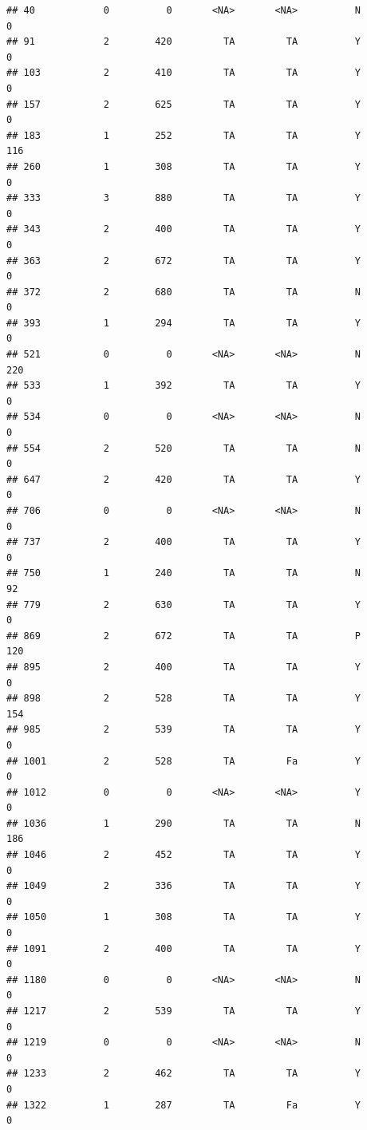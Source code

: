 \documentclass[]{article}
\begin{document}
\begin{verbatim}
## 40            0          0       <NA>       <NA>          N          0
## 91            2        420         TA         TA          Y          0
## 103           2        410         TA         TA          Y          0
## 157           2        625         TA         TA          Y          0
## 183           1        252         TA         TA          Y        116
## 260           1        308         TA         TA          Y          0
## 333           3        880         TA         TA          Y          0
## 343           2        400         TA         TA          Y          0
## 363           2        672         TA         TA          Y          0
## 372           2        680         TA         TA          N          0
## 393           1        294         TA         TA          Y          0
## 521           0          0       <NA>       <NA>          N        220
## 533           1        392         TA         TA          Y          0
## 534           0          0       <NA>       <NA>          N          0
## 554           2        520         TA         TA          N          0
## 647           2        420         TA         TA          Y          0
## 706           0          0       <NA>       <NA>          N          0
## 737           2        400         TA         TA          Y          0
## 750           1        240         TA         TA          N         92
## 779           2        630         TA         TA          Y          0
## 869           2        672         TA         TA          P        120
## 895           2        400         TA         TA          Y          0
## 898           2        528         TA         TA          Y        154
## 985           2        539         TA         TA          Y          0
## 1001          2        528         TA         Fa          Y          0
## 1012          0          0       <NA>       <NA>          Y          0
## 1036          1        290         TA         TA          N        186
## 1046          2        452         TA         TA          Y          0
## 1049          2        336         TA         TA          Y          0
## 1050          1        308         TA         TA          Y          0
## 1091          2        400         TA         TA          Y          0
## 1180          0          0       <NA>       <NA>          N          0
## 1217          2        539         TA         TA          Y          0
## 1219          0          0       <NA>       <NA>          N          0
## 1233          2        462         TA         TA          Y          0
## 1322          1        287         TA         Fa          Y          0

\end{verbatim}
\end{document}

